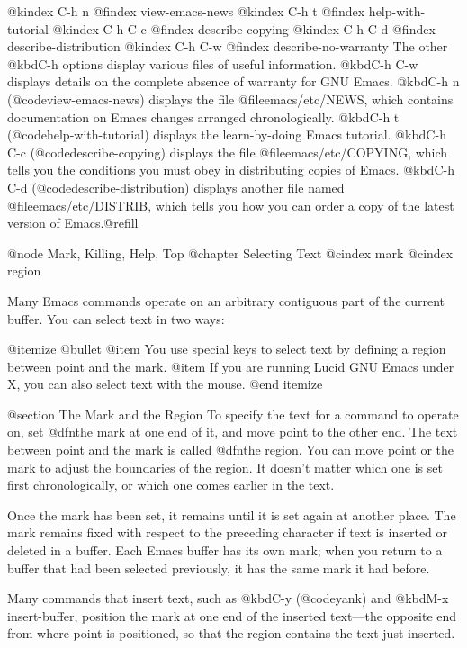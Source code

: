 {{@kindex C-h n
@findex view-emacs-news
@kindex C-h t
@findex help-with-tutorial
@kindex C-h C-c
@findex describe-copying
@kindex C-h C-d
@findex describe-distribution
@kindex C-h C-w
@findex describe-no-warranty
  The other @kbd{C-h} options display various files of useful
information.  @kbd{C-h C-w} displays details on the complete
absence of warranty for GNU Emacs.  @kbd{C-h n} (@code{view-emacs-news})
displays the file @file{emacs/etc/NEWS}, which contains documentation on
Emacs changes arranged chronologically.  @kbd{C-h t}
(@code{help-with-tutorial}) displays the learn-by-doing Emacs tutorial.
@kbd{C-h C-c} (@code{describe-copying}) displays the file
@file{emacs/etc/COPYING}, which tells you the conditions you must obey
in distributing copies of Emacs.  @kbd{C-h C-d}
(@code{describe-distribution}) displays another file named
@file{emacs/etc/DISTRIB}, which tells you how you can order a copy of
the latest version of Emacs.@refill

@node Mark, Killing, Help, Top
@chapter Selecting Text
@cindex mark
@cindex region

  Many Emacs commands operate on an arbitrary contiguous
part of the current buffer. You can select text in two ways:

@itemize @bullet
@item
You use special keys to select text by defining a region between point
and the mark. 
@item
If you are running Lucid GNU Emacs under X, you can also select text
with the mouse. 
@end itemize

@section The Mark and the Region
 To specify the text for a command to operate on, set @dfn{the
mark} at one end of it, and move point to the other end.  The text
between point and the mark is called @dfn{the region}.  You can move
point or the mark to adjust the boundaries of the region.  It doesn't
matter which one is set first chronologically, or which one comes
earlier in the text.
  
  Once the mark has been set, it remains until it is set again at
another place.  The mark remains fixed with respect to the preceding
character if text is inserted or deleted in a buffer.  Each Emacs
buffer has its own mark; when you return to a buffer that had been
selected previously, it has the same mark it had before.

  Many commands that insert text, such as @kbd{C-y} (@code{yank}) and
@kbd{M-x insert-buffer}, position the mark at one end of the inserted
text---the opposite end from where point is positioned, so that the region
contains the text just inserted.

}}
